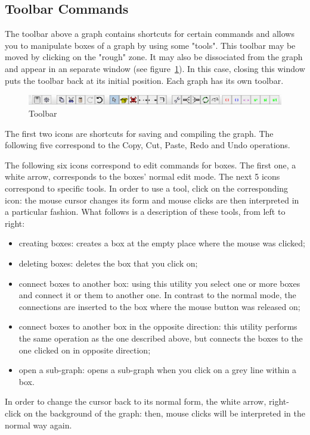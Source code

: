\subsection{Toolbar Commands}
\label{toolbar-commands}

The toolbar above a graph contains shortcuts for certain commands
and allows you to manipulate boxes of a graph by using some "tools". This
toolbar may be moved by clicking on the "rough" zone. It may also be dissociated
from the graph and appear in an separate window (see
figure~\ref{fig-toolbar}). In this case, closing this window puts
the toolbar back at its initial position. Each graph has its own toolbar.

\begin{figure}[!ht]
\begin{center}
\includegraphics[width=15.6cm]{resources/img/fig5-20.png}
\caption{Toolbar\label{fig-toolbar}}
\end{center}
\end{figure}

\medskip
{}
\noindent The first two icons are shortcuts for saving and compiling the graph.
The following five correspond to the Copy, Cut, Paste, Redo and Undo operations. 

\bigskip
\noindent The following six icons correspond to edit commands for boxes. The first
one, a white arrow, corresponds to the boxes' normal edit mode. The next 5 icons
correspond to specific tools. In order to use a tool, click on the
corresponding icon: the mouse cursor changes its form and mouse clicks are then
interpreted in a particular fashion. What follows is a description of these
tools, from left to right:

\begin{itemize}
  \item creating boxes: creates a box at the empty place where the mouse was clicked;
  \item deleting boxes: deletes the box that you click on;
  \item connect boxes to another box: using this utility you select one or
  more boxes and connect it or them to another one. In contrast to the
  normal mode, the connections are inserted to the box where the mouse button
  was released on;
  \item connect boxes to another box in the opposite direction: this utility
  performs the same operation as the one described above, but connects the boxes
  to the one clicked on in opposite direction;
  \item open a sub-graph: opens a sub-graph when you click on a grey line within a box.
\end{itemize}
In order to change the cursor back to its normal form, the white arrow, right-click on the background of the graph:
then, mouse clicks will be interpreted in the normal way again.

